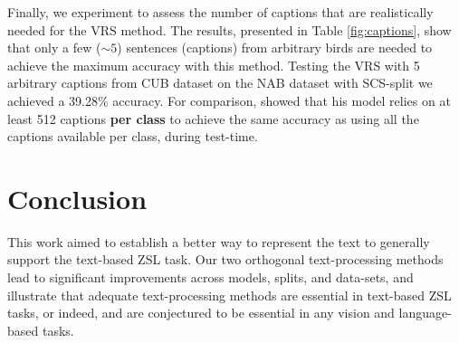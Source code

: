 \documentclass[11pt,a4paper]{article}
\newcommand\reut[1]{\textcolor{green}{\textbf{REUT:} #1 }}
\begin{document}
Finally, we experiment to assess the  number of captions that are realistically needed for the VRS method. The results, presented in Table \ref{fig:captions}, show that only a few ($\sim5$) 
 sentences (captions) from arbitrary birds are needed to achieve the maximum accuracy with this method.
Testing the VRS with 5 arbitrary captions from CUB dataset on the NAB dataset with SCS-split we achieved a 39.28\% accuracy. %
For comparison, \citet{reed2016learning} showed that his model relies on at least 512 captions \textbf{per class} to achieve the same accuracy as using all the captions available per class, during test-time.




\par



\section{Conclusion}
\label{conclusion}

This work aimed to establish a better way to represent the text to generally support the text-based ZSL task. Our two orthogonal text-processing methods lead to significant improvements across models, splits, and data-sets, and illustrate that adequate text-processing methods are essential in text-based ZSL tasks, or indeed, and are conjectured to be essential in any vision and language-based tasks. 




\end{document}
